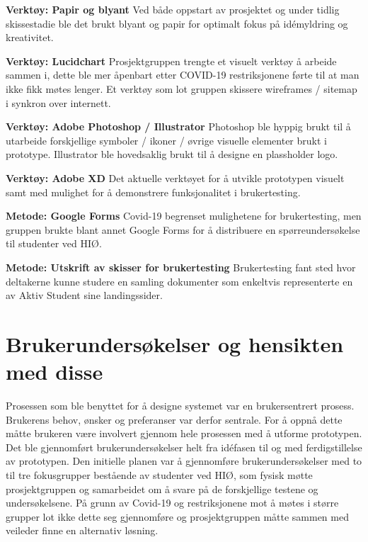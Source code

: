\begin{compactitem}
\item [{\bf  Verktøy: Papir og blyant} ] Ved både oppstart av prosjektet og under tidlig skissestadie ble det brukt blyant og papir for optimalt fokus på idémyldring og kreativitet.
\item [{\bf  Verktøy: Lucidchart} ] Prosjektgruppen trengte et visuelt verktøy å arbeide sammen i, dette ble mer åpenbart etter COVID-19 restriksjonene førte til at man ikke fikk møtes lenger. Et verktøy som lot gruppen skissere wireframes / sitemap i synkron over internett.
\item [{\bf  Verktøy: Adobe Photoshop / Illustrator} ] Photoshop ble hyppig brukt til å utarbeide forskjellige symboler / ikoner / øvrige visuelle elementer brukt i prototype. Illustrator ble hovedsaklig brukt til å designe en plassholder logo.
\item [{\bf  Verktøy: Adobe XD} ] Det aktuelle verktøyet for å utvikle prototypen visuelt samt med mulighet for å demonstrere funksjonalitet i brukertesting.
\item [{\bf  Metode: Google Forms} ] Covid-19 begrenset mulighetene for brukertesting, men gruppen brukte blant annet Google Forms for å distribuere en spørreundersøkelse til studenter ved HIØ.
\item [{\bf  Metode: Utskrift av skisser for brukertesting} ] Brukertesting fant sted hvor deltakerne kunne studere en samling dokumenter som enkeltvis representerte en av Aktiv Student sine landingssider.
\end{compactitem} 

\section{Brukerundersøkelser og hensikten med disse}
Prosessen som ble benyttet for å designe systemet var en brukersentrert prosess. Brukerens behov, ønsker og preferanser var derfor sentrale. For å oppnå dette måtte brukeren være involvert gjennom hele prosessen med å utforme prototypen. Det ble gjennomført brukerundersøkelser helt fra idéfasen til og med ferdigstillelse av prototypen.
Den initielle planen var å gjennomføre brukerundersøkelser med to til tre fokusgrupper bestående av studenter ved HIØ, som fysisk møtte prosjektgruppen og samarbeidet om å svare på de forskjellige testene og undersøkelsene. På grunn av Covid-19 og restriksjonene mot å møtes i større grupper lot ikke dette seg gjennomføre og prosjektgruppen måtte sammen med veileder finne en alternativ løsning.

